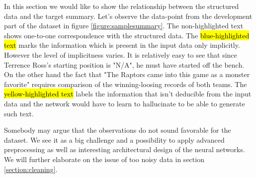 In this section we would like to show the relationship between the structured data and the target summary. Let's observe the data-point from the development part of the dataset in figure \ref{figure:samplesummary}. The non-highlighted text shows one-to-one correspondence with the structured data. The  \hl{blue-highlighted text} marks the information which is present in the input data only implicitly. However the level of implicitness varies. It is relatively easy to see that since Terrence Ross's starting position is "N/A", he must have started off the bench. On the other hand the fact that "The Raptors came into this game as a monster favorite" requires comparison of the winning-loosing records of both teams. The  \hl{yellow-highlighted text} labels the information that isn't deducible from the input data and the network would have to learn to hallucinate to be able to generate such text.

Somebody may argue that the observations do not sound favorable for the dataset. We see it as a big challenge and a possibility to apply advanced preprocessing as well as interesting architectural design of the neural networks. We will further elaborate on the issue of too noisy data in section \ref{section:cleaning}.



